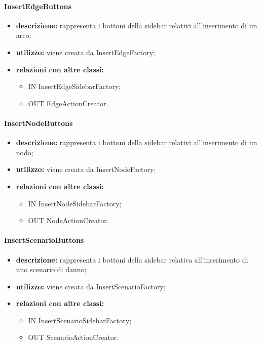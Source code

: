 \paragraph{InsertEdgeButtons}
\begin{itemize}
	\item \textbf{descrizione:} rappresenta i bottoni della sidebar relativi all'inserimento di un arco;
	\item \textbf{utilizzo:} viene creata da InsertEdgeFactory;
	\item \textbf{relazioni con altre classi:} 
	\begin{itemize}
		\item IN InsertEdgeSidebarFactory;
		\item OUT EdgeActionCreator.
	\end{itemize}
\end{itemize}
\paragraph{InsertNodeButtons}
\begin{itemize}
	\item \textbf{descrizione:} rappresenta i bottoni della sidebar relativi all'inserimento di un nodo;
	\item \textbf{utilizzo:} viene creata da InsertNodeFactory;
	\item \textbf{relazioni con altre classi:} 
	\begin{itemize}
		\item IN InsertNodeSidebarFactory;
		\item OUT NodeActionCreator.
	\end{itemize}
\end{itemize}
\paragraph{InsertScenarioButtons}
\begin{itemize}
	\item \textbf{descrizione:} rappresenta i bottoni della sidebar relativa all'inserimento di uno scenario di danno;
	\item \textbf{utilizzo:} viene creata da InsertScenarioFactory;
	\item \textbf{relazioni con altre classi:} 
	\begin{itemize}
		\item IN InsertScenarioSidebarFactory;
		\item OUT ScenarioActionCreator.
	\end{itemize}
\end{itemize}
